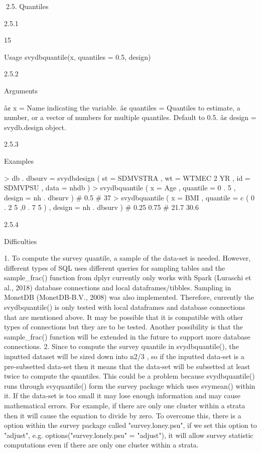2.5. Quantiles

2.5.1

15

Usage
svydbquantile(x, quantiles = 0.5, design)

2.5.2

Arguments

â¢ x = Name indicating the variable.
â¢ quantiles = Quantiles to estimate, a number, or a vector of numbers for multiple
quantiles. Default to 0.5.
â¢ design = svydb.design object.

2.5.3

Examples

> db . dbsurv = svydbdesign ( st = SDMVSTRA , wt = WTMEC 2 YR ,
id = SDMVPSU , data = nhdb )
> svydbquantile ( x = Age , quantile = 0 . 5 , design = nh . dbsurv )
# 0.5
# 37
> svydbquantile ( x = BMI , quantile = c ( 0 . 2 5 ,0 . 7 5 ) ,
design = nh . dbsurv )
# 0.25 0.75
# 21.7 30.6

2.5.4

Difficulties

1. To compute the survey quantile, a sample of the data-set is needed. However, different types of SQL uses different queries for sampling tables and the
sample_frac() function from dplyr currently only works with Spark (Luraschi
et al., 2018) database connections and local dataframes/tibbles. Sampling in
MonetDB (MonetDB-B.V., 2008) was also implemented. Therefore, currently
the svydbquantile() is only tested with local dataframes and database connections that are mentioned above. It may be possible that it is compatible
with other types of connections but they are to be tested. Another possibility
is that the sample_frac() function will be extended in the future to support
more database connections.
2. Since to compute the survey quantile in svydbquantile(), the inputted dataset will be sized down into n2/3 , so if the inputted data-set is a pre-subsetted
data-set then it means that the data-set will be subsetted at least twice to compute the quantiles. This could be a problem because svydbquantile() runs
through svyquantile() form the survey package which uses svymean() within
it. If the data-set is too small it may lose enough information and may cause
mathematical errors. For example, if there are only one cluster within a strata
then it will cause the equation to divide by zero.
To overcome this, there is a option within the survey package called "survey.loney.psu", if we set this option to "adjust", e.g. options("survey.lonely.psu"
= "adjust"), it will allow survey statistic computations even if there are only
one cluster within a strata.

